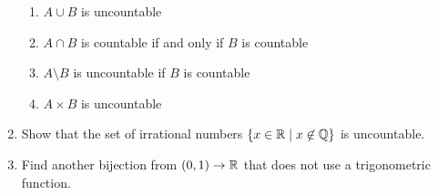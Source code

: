 \documentclass[main.tex]{subfiles}
\begin{document}
\begin{enumerate}
	\begin{enumerate}
		\item \(A \cup B\) is uncountable
		\item \(A \cap B\) is countable if and only if \(B\) is countable
		\item \(A \setminus B\) is uncountable if \(B\) is countable
		\item \(A \times B\) is uncountable
	\end{enumerate}
	\item Show that the set of irrational numbers \(\{ x \in \mathbb{R} \mid x \not\in \mathbb{Q} \}\) is uncountable.
	\item Find another bijection from \((0,1) \rightarrow \mathbb{R}\) that does not use a trigonometric function.
\end{enumerate}
\end{document}
